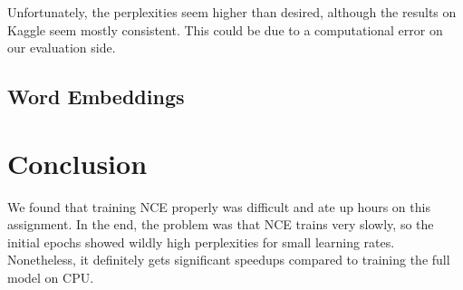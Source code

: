 \documentclass[11pt]{article}
\begin{document}

Unfortunately, the perplexities seem higher than desired, although the results on Kaggle seem mostly consistent. This could be due to a computational error on our evaluation side.

\subsection{Word Embeddings}


\section{Conclusion}


We found that training NCE properly was difficult and ate up hours on this assignment. In the end, the problem was that NCE trains very slowly, so the initial epochs showed wildly high perplexities for small learning rates. Nonetheless, it definitely gets significant speedups compared to training the full model on CPU.



\end{document}
